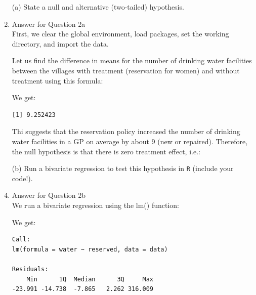 \documentclass[12pt,letterpaper]{article}
\begin{document}
\newpage
\begin{enumerate}
	\item [(a)] State a null and alternative (two-tailed) hypothesis. 
	
				\item
Answer for Question 2a\\
\noindent First, we clear the global environment, load packages, set the working directory, and import the data.\\
\vspace{.5cm}
  
\vspace{.5cm}
\noindent Let us find the difference in means for the number of drinking water facilities between the villages with treatment (reservation for women) and without treatment using this formula:\\
\vspace{.5cm}
  
\vspace{.5cm}
\noindent We get:\\
\begin{verbatim}
[1] 9.252423
\end{verbatim}
\noindent Thi suggests that the reservation policy increased the number of drinking water facilities in a GP on average by about 9 (new or repaired). Therefore, the null hypothesis is that there is zero treatment effect, i.e.:\\
\vspace{.5cm}
  
\vspace{.5cm}
	
	\vspace{6cm}
	\item [(b)] Run a bivariate regression to test this hypothesis in \texttt{R} (include your code!).
					\item
Answer for Question 2b\\
\noindent We run a bivariate regression using the lm() function:\\
\vspace{.5cm}
  
\vspace{.5cm}
\noindent We get:\\
\begin{verbatim}
Call:
lm(formula = water ~ reserved, data = data)

Residuals:
    Min      1Q  Median      3Q     Max 
-23.991 -14.738  -7.865   2.262 316.009 


\end{verbatim}
\end{enumerate}
\end{document}
